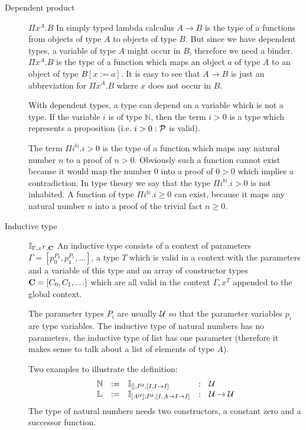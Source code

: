 \begin{description}
\item[Dependent product] $\Pi x^A.B$ In simply typed lambda calculus
  $A \to B$ is the type of a functions from objects of type $A$ to objects of
  type $B$. But since we have dependent types, a variable of type $A$ might
  occur in $B$, therefore we need a binder. $\Pi x^A. B$ is the type of a
  function which maps an object $a$ of type $A$ to an object of type
  $B[x:=a]$. It is easy to see that $A \to B$ is just an abbreviation for
  $\Pi x^A.B$ where $x$ does not occur in $B$.

  With dependent types, a type can depend on a variable which is not a
  type. If the variable $i$ is of type $\mathbb{N}$, then the term $i > 0$ is
  a type which represents a proposition (i.e. $i > 0: {\cal{P}}$ is valid).

  The term $\Pi i^{\mathbb{N}}. i > 0$ is the type of a function which maps
  any natural number $n$ to a proof of $n > 0$. Obviously such a function
  cannot exist because it would map the number $0$ into a proof of $0 > 0$
  which implies a contradiction. In type theory we say that the type
  $\Pi i^{\mathbb{N}}. i > 0$ is not inhabited. A function of type
  $\Pi i^{\mathbb{N}}. i \ge 0$ can exist, because it maps any natural number
  $n$ into a proof of the trivial fact $n \ge 0$.

\item[Inductive type] $\mathbb{I}_{\Gamma,x^T,\mathbf{C}}$ An inductive type
  consists of a context of parameters
  $\Gamma = [p_0^{P_0}, p_1^{P_1}, \ldots]$, a type $T$ which is valid in a
  context with the parameters and a variable of this type and an array of
  constructor types $\mathbf{C} = [C_0, C_1, \ldots]$ which are all valid in the
  context $\Gamma, x^T$ appended to the global context.

  The parameter types $P_i$ are usually ${\cal{U}}$ so that the parameter variables
  $p_i$ are type variables. The inductive type of natural numbers has no
  parameters, the inductive type of list has one parameter (therefore it makes
  sense to talk about a list of elements of type $A$).

  Two examples to illustrate the definition:
  $$
  \begin{array}{lllll}
    \mathbb{N}
    &:=& \mathbb{I}_{[], I^{\cal{U}}, [I, I \to I]}
    &:& {\cal{U}}
    \\
    \mathbb{L}
    &:=& \mathbb{I}_{[A^{\cal{U}}],  I^{\cal{U}},  [I, A \to I \to I]}
    &:& {\cal{U}} \to {\cal{U}}
  \end{array}
  $$
  The type of natural numbers needs two constructors, a constant zero and a
  successor function.


\end{description}
